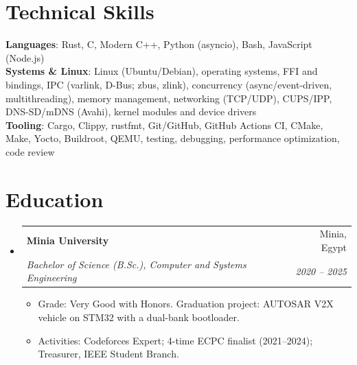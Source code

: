 \documentclass[letterpaper,11pt]{article}
\makeatletter
\newcommand{\resumeItem}[1]{
  \item\small{
    {#1 \vspace{-2pt}}
  }
}
\newcommand{\resumeSubheading}[4]{
  \vspace{-2pt}\item
    \begin{tabular*}{0.97\textwidth}[t]{l@{\extracolsep{\fill}}r}
      \textbf{#1} & #2 \\
      \textit{\small#3} & \textit{\small #4} \\
    \end{tabular*}\vspace{-7pt}
}
\newcommand{\resumeSubHeadingListStart}{\begin{itemize}[leftmargin=0.15in, label={}]}
\newcommand{\resumeSubHeadingListEnd}{\end{itemize}}
\newcommand{\resumeItemListStart}{\begin{itemize}}
\newcommand{\resumeItemListEnd}{\end{itemize}\vspace{-5pt}}
\makeatother
\begin{document}
%
\section{Technical Skills}
 \begin{itemize}[leftmargin=0.15in, label={}]
    \small{\item{
     \textbf{Languages}{: Rust, C, Modern C++, Python (asyncio), Bash, JavaScript (Node.js)} \\
     \textbf{Systems \& Linux}{: Linux (Ubuntu/Debian), operating systems, FFI and bindings, IPC (varlink, D-Bus; zbus, zlink), concurrency (async/event-driven, multithreading), memory management, networking (TCP/UDP), CUPS/IPP, DNS-SD/mDNS (Avahi), kernel modules and device drivers} \\
     \textbf{Tooling}{: Cargo, Clippy, rustfmt, Git/GitHub, GitHub Actions CI, CMake, Make, Yocto, Buildroot, QEMU, testing, debugging, performance optimization, code review}
    }}
 \end{itemize}

\section{Education}
  \resumeSubHeadingListStart
    \resumeSubheading
      {Minia University}{Minia, Egypt}
      {Bachelor of Science (B.Sc.), Computer and Systems Engineering}{2020 -- 2025}
      \resumeItemListStart
        \resumeItem{Grade: Very Good with Honors. Graduation project: AUTOSAR V2X vehicle on STM32 with a dual-bank bootloader.}
        \resumeItem{Activities: Codeforces Expert; 4-time ECPC finalist (2021--2024); Treasurer, IEEE Student Branch.}
      \resumeItemListEnd
  \resumeSubHeadingListEnd


\end{document}

